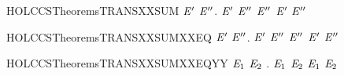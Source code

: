 \newcommand{\HOLCCSTheoremsTRANSXXstrongind}{\UseVerbatim{HOLCCSTheoremsTRANSXXstrongind}}
\begin{SaveVerbatim}{HOLCCSTheoremsTRANSXXSUM}
\HOLTokenTurnstile{} \HOLSymConst{\HOLTokenForall{}} \ensuremath{\HOLBoundVar{E}\sp{\prime{}}}  \ensuremath{\HOLBoundVar{E}\sp{\prime{}\prime{}}}.  \HOLSymConst{\ensuremath{+}} \ensuremath{\HOLBoundVar{E}\sp{\prime{}}} \HOLTokenTransBegin{}\HOLTokenTransEnd \ensuremath{\HOLBoundVar{E}\sp{\prime{}\prime{}}} \HOLSymConst{\HOLTokenImp{}}  \HOLTokenTransBegin{}\HOLTokenTransEnd \ensuremath{\HOLBoundVar{E}\sp{\prime{}\prime{}}} \HOLSymConst{\HOLTokenDisj{}} \ensuremath{\HOLBoundVar{E}\sp{\prime{}}} \HOLTokenTransBegin{}\HOLTokenTransEnd \ensuremath{\HOLBoundVar{E}\sp{\prime{}\prime{}}}
\end{SaveVerbatim}
\newcommand{\HOLCCSTheoremsTRANSXXSUM}{\UseVerbatim{HOLCCSTheoremsTRANSXXSUM}}
\begin{SaveVerbatim}{HOLCCSTheoremsTRANSXXSUMXXEQ}
\HOLTokenTurnstile{} \HOLSymConst{\HOLTokenForall{}} \ensuremath{\HOLBoundVar{E}\sp{\prime{}}}  \ensuremath{\HOLBoundVar{E}\sp{\prime{}\prime{}}}.  \HOLSymConst{\ensuremath{+}} \ensuremath{\HOLBoundVar{E}\sp{\prime{}}} \HOLTokenTransBegin{}\HOLTokenTransEnd \ensuremath{\HOLBoundVar{E}\sp{\prime{}\prime{}}} \HOLSymConst{\HOLTokenEquiv{}}  \HOLTokenTransBegin{}\HOLTokenTransEnd \ensuremath{\HOLBoundVar{E}\sp{\prime{}\prime{}}} \HOLSymConst{\HOLTokenDisj{}} \ensuremath{\HOLBoundVar{E}\sp{\prime{}}} \HOLTokenTransBegin{}\HOLTokenTransEnd \ensuremath{\HOLBoundVar{E}\sp{\prime{}\prime{}}}
\end{SaveVerbatim}
\newcommand{\HOLCCSTheoremsTRANSXXSUMXXEQ}{\UseVerbatim{HOLCCSTheoremsTRANSXXSUMXXEQ}}
\begin{SaveVerbatim}{HOLCCSTheoremsTRANSXXSUMXXEQYY}
\HOLTokenTurnstile{} \HOLSymConst{\HOLTokenForall{}}\ensuremath{\HOLBoundVar{E}\sb{\mathrm{1}}} \ensuremath{\HOLBoundVar{E}\sb{\mathrm{2}}}  . \ensuremath{\HOLBoundVar{E}\sb{\mathrm{1}}} \HOLSymConst{\ensuremath{+}} \ensuremath{\HOLBoundVar{E}\sb{\mathrm{2}}} \HOLTokenTransBegin{}\HOLTokenTransEnd {} \HOLSymConst{\HOLTokenEquiv{}} \ensuremath{\HOLBoundVar{E}\sb{\mathrm{1}}} \HOLTokenTransBegin{}\HOLTokenTransEnd {} \HOLSymConst{\HOLTokenDisj{}} \ensuremath{\HOLBoundVar{E}\sb{\mathrm{2}}} \HOLTokenTransBegin{}\HOLTokenTransEnd {}
\end{SaveVerbatim}
